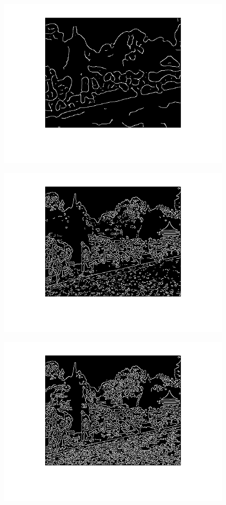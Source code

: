 \documentclass[12pt, a4paper]{article}
\begin{document}
\begin{figure}[H]
	\centering
	\includegraphics[width=\textwidth]{fig11.png}
\end{figure}
\begin{figure}[H]
	\centering
	\includegraphics[width=\textwidth]{fig12.png}
\end{figure}
\begin{figure}[H]
	\centering
	\includegraphics[width=\textwidth]{fig13.png}
\end{figure}
\end{document}

